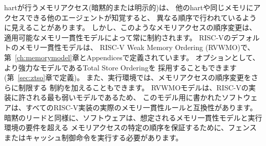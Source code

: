 hartが行うメモリアクセス(暗黙的または明示的)は、
他のhartや同じメモリにアクセスできる他のエージェントが知覚すると、
異なる順序で行われているように見えることがあります。
しかし、このようなメモリアクセスの順序変更は、適用可能なメモリ一貫性モデルによって常に制約されます。
RISC-Vのデフォルトのメモリ一貫性モデルは、
RISC-V Weak Memory Ordering (RVWMO)で、第~\ref{ch:memorymodel}章とAppendicesで定義されています。
オプションとして、より強力なモデルであるTotal Store Orderingを
採用することもできます(第~\ref{sec:ztso}章で定義)。 
また、実行環境では、メモリアクセスの順序変更をさらに制限する
制約を加えることもできます。
RVWMOモデルは、RISC-Vの実装に許される最も弱いモデルであるため、
このモデル用に書かれたソフトウェアは、すべてのRISC-V実装の実際のメモリ一貫性ルールと互換性があります。
暗黙のリードと同様に、ソフトウェアは、想定されるメモリ一貫性モデルと実行環境の要件を超える
メモリアクセスの特定の順序を保証するために、フェンスまたはキャッシュ制御命令を実行する必要があります。

\begin{comment}
\section{Base Instruction-Length Encoding}

The base RISC-V ISA has fixed-length 32-bit instructions that must be
naturally aligned on 32-bit boundaries.  However, the standard RISC-V
encoding scheme is designed to support ISA extensions with
variable-length instructions, where each instruction can be any number
of 16-bit instruction {\em parcels} in length and parcels are
naturally aligned on 16-bit boundaries.  The standard compressed ISA
extension described in Chapter~\ref{compressed} reduces code size by
providing compressed 16-bit instructions and relaxes the alignment
constraints to allow all instructions (16 bit and 32 bit) to be
aligned on any 16-bit boundary to improve code density.

We use the term IALIGN (measured in bits) to refer to the instruction-address
alignment constraint the implementation enforces.  IALIGN is 32 bits in the
base ISA, but some ISA extensions, including the compressed ISA extension,
relax IALIGN to 16 bits.  IALIGN may not take on any value other than 16 or
32.

We use the term ILEN (measured in bits) to refer to the maximum
instruction length supported by an implementation, and which is always
a multiple of IALIGN.  For implementations supporting only a base
instruction set, ILEN is 32 bits.  Implementations supporting longer
instructions have larger values of ILEN.

Figure~\ref{instlengthcode} illustrates the standard RISC-V
instruction-length encoding convention.  All the 32-bit instructions
in the base ISA have their lowest two bits set to {\tt 11}.  The
optional compressed 16-bit instruction-set extensions have their
lowest two bits equal to {\tt 00}, {\tt 01}, or {\tt 10}.
\end{comment}

